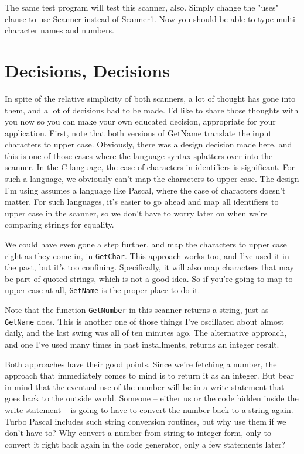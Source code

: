 The same test program will test this scanner, also. Simply change the "uses" clause to use Scanner instead of Scanner1. Now you should be able to type multi-character names and numbers.

\section{Decisions, Decisions}

In spite of the relative simplicity of both scanners, a lot of thought has gone into them, and a lot of decisions had to be made. I'd like to share those thoughts with you now so you can make your own educated decision, appropriate for your application. First, note that both versions of GetName translate the input characters to upper case. Obviously, there was a design decision made here, and this is one of those cases where the language syntax splatters over into the scanner. In the C language, the case of characters in identifiers is significant. For such a language, we obviously can't map the characters to upper case. The design I'm using assumes a language like Pascal, where the case of characters doesn't matter. For such languages, it's easier to go ahead and map all identifiers to upper case in the scanner, so we don't have to worry later on when we're comparing strings for equality.

We could have even gone a step further, and map the characters to upper case right as they come in, in {\tt GetChar}. This approach works too, and I've used it in the past, but it's too confining. Specifically, it will also map characters that may be part of quoted strings, which is not a good idea. So if you're going to map to upper case at all, {\tt GetName} is the proper place to do it.

Note that the function {\tt GetNumber} in this scanner returns a string, just as {\tt GetName} does. This is another one of those things I've oscillated about almost daily, and the last swing was all of ten minutes ago. The alternative approach, and one I've used many times in past installments, returns an integer result.

Both approaches have their good points. Since we're fetching a number, the approach that immediately comes to mind is to return it as an integer. But bear in mind that the eventual use of the number will be in a write statement that goes back to the outside world. Someone -- either us or the code hidden inside the write statement -- is going to have to convert the number back to a string again. Turbo Pascal includes such string conversion routines, but why use them if we don't have to?  Why convert a number from string to integer form, only to convert it right back again in the code generator, only a few statements later?

